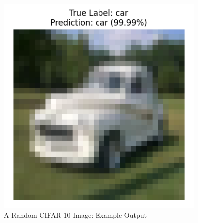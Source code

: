 \begin{frame}
\begin{columns}[t]
    \begin{column}{0.5\textwidth}
        \begin{figure}
            \centering
            \vspace{-1cm}
            \includegraphics[width=0.9\textwidth]{media/1stAssignment/random_cifar.png}
            \vspace{-0.3cm}
            \caption{A Random CIFAR-10 Image: Example Output}
        \end{figure}
    \end{column}
\end{columns}
\end{frame}

